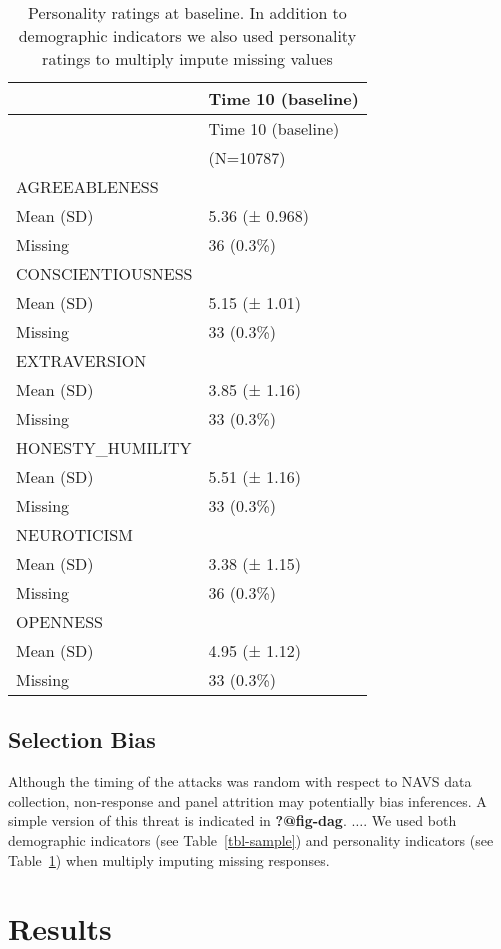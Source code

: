 \documentclass[
  singlecolumn]{report}
\begin{document}
\hypertarget{tbl-personality}{}
\begin{longtable}[]{@{}ll@{}}
\caption{\label{tbl-personality}Personality ratings at baseline. In
addition to demographic indicators we also used personality ratings to
multiply impute missing values}\tabularnewline
\toprule\noalign{}
& Time 10 (baseline) \\
\midrule\noalign{}
\endfirsthead
\toprule\noalign{}
& Time 10 (baseline) \\
\midrule\noalign{}
\endhead
\bottomrule\noalign{}
\endlastfoot
& (N=10787) \\
AGREEABLENESS & \\
Mean (SD) & 5.36 (± 0.968) \\
Missing & 36 (0.3\%) \\
CONSCIENTIOUSNESS & \\
Mean (SD) & 5.15 (± 1.01) \\
Missing & 33 (0.3\%) \\
EXTRAVERSION & \\
Mean (SD) & 3.85 (± 1.16) \\
Missing & 33 (0.3\%) \\
HONESTY\_HUMILITY & \\
Mean (SD) & 5.51 (± 1.16) \\
Missing & 33 (0.3\%) \\
NEUROTICISM & \\
Mean (SD) & 3.38 (± 1.15) \\
Missing & 36 (0.3\%) \\
OPENNESS & \\
Mean (SD) & 4.95 (± 1.12) \\
Missing & 33 (0.3\%) \\
\end{longtable}

\hypertarget{selection-bias}{%
\subsection{Selection Bias}\label{selection-bias}}

Although the timing of the attacks was random with respect to NAVS data
collection, non-response and panel attrition may potentially bias
inferences. A simple version of this threat is indicated in
\textbf{?@fig-dag}. \(\dots\). We used both demographic indicators (see
Table~\ref{tbl-sample}) and personality indicators (see
Table~\ref{tbl-personality}) when multiply imputing missing responses.

\hypertarget{results}{%
\section{Results}\label{results}}
\end{document}
